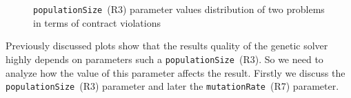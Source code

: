 \begin{figure}
	
	
	\caption[\texttt{populationSize}~(R3) parameter values distribution of two problems in terms of contract violations]{\texttt{populationSize}~(R3) parameter values distribution of two problems in terms of contract violations}
	\label{fig:populationSize_gradient}
\end{figure}



Previously discussed plots show that the results quality of the genetic solver highly depends on parameters such a \texttt{populationSize}~(R3). So we need to analyze how the value of this parameter affects the result. Firstly we discuss the \texttt{populationSize}~(R3) parameter and later the \texttt{mutationRate}~(R7) parameter.

